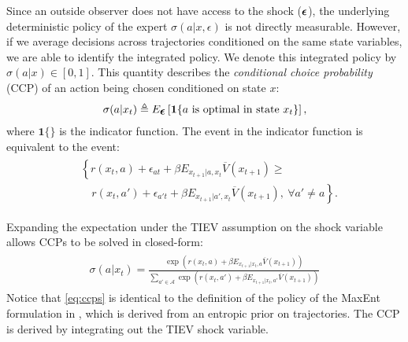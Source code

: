 \documentclass{article}
\renewcommand{\vec}[1]{\mbox{\bm{$#1$}}}
\begin{document}
Since an outside observer does not have access to the shock ($\vec{\epsilon}$), the underlying deterministic policy of the expert $\sigma(a | x,\epsilon)$ is not directly measurable. However, if we average decisions across trajectories conditioned on the same state variables, we are able to identify the integrated policy. We denote this integrated policy by $\sigma(a|x)\in[0,1]$. This quantity describes the \emph{conditional choice probability} (CCP) of an action being chosen conditioned on state $x$: 
\begin{eqnarray}
\sigma(a|x_t)\triangleq E_{\vec{\epsilon}}\left[ \mathbf{1}\{a\ \textrm{is optimal in state }x_t\}\right],
\end{eqnarray}
where $\mathbf{1}\{\}$ is the indicator function. The event in the indicator function is equivalent to the event:
\begin{align}
\begin{split}
& \left\{r(x_t,a)+\epsilon_{at}+\beta E_{x_{t+1}|a,x_t} \overline{V}(x_{t+1})\geq \right. \\
& \quad \left. r(x_t,a')+\epsilon_{a't}+\beta E_{x_{t+1}|a',x_t} \overline{V}(x_{t+1}),\ \forall a'\neq a \right\}.
\end{split}
\end{align}

Expanding the expectation under the TIEV assumption on the shock variable allows CCPs to be solved in closed-form:
\begin{align} \label{eq:ccps}
\begin{split}
\sigma(a|x_t)=\frac{\exp\left(r(x_t,a)+\beta E_{x_{t+1}|x_t,a} \overline{V}(x_{t+1})\right)}{\sum_{a'\in\mathcal{A}} \exp\left(r(x_t,a')+\beta E_{x_{t+1}|x_t,a'} \overline{V}(x_{t+1})\right)}
\end{split}
\end{align}
Notice that \eqref{eq:ccps} is identical to the definition of the policy of the MaxEnt formulation in \cite{ziebart_phd}, which is derived from an entropic prior on trajectories. The CCP is derived by integrating out the TIEV shock variable. 
\end{document}
